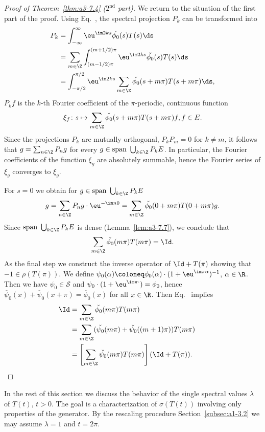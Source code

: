 \begin{proof}[Proof of Theorem~\ref{thm:a3-7.4} ($ 2^{\text{nd}} $ part)]
We return to the situation of the first part of the proof.
Using Eq.~, the spectral projection $P_{k}$ can be transformed into
\begin{align*}
P_{k} &= \int_{-\infty}^{\infty} \eu^{\im 2ks}\check{\phi_{0}}(s)T(s)\ds \\
&= \sum_{m\in\Z} \int_{(m-1/2)\pi}^{(m+1/2)\pi} \eu^{\im 2ks}\check{\phi_{0}}(s)T(s)\ds \\
&= \int_{-\pi/2}^{\pi/2} \eu^{\im 2ks}\sum_{m\in\Z}\check{\phi_{0}}(s+m\pi)T(s+m\pi)\ds ,
\end{align*}
\ie $P_{k}f$ is the $k$-th Fourier coefficient of the $\pi$-periodic, continuous function 
\[
\xi_{f} \colon s \mapsto \sum_{m\in\Z} \check{\phi_{0}}(s+m\pi)T(s+m\pi)f ,  f \in E .
\]
Since the projections $P_{k}$ are mutually orthogonal, \ie $P_{k}P_{m} = 0$ for $k \neq m$, it follows that $g = \sum_{n\in\Z} P_{n}g$ for every $g \in \text{span }\bigcup_{k\in\Z} P_{k}E$.
In particular, the Fourier coefficients of the function $\xi_{g}$ are absolutely summable, hence the Fourier series of\/ $\xi_{g}$ converges to $\xi_g$.

For $s = 0$ we obtain for 
$g \in \text{span }\bigcup_{k\in\Z} P_{k}E$
\[
g = \sum_{n\in\Z} P_{n}g\cdot \eu^{-\im n0} = \sum_{m\in\Z} \check{\phi_{0}}(0 + m\pi)T(0 + m\pi)g .
\]
Since $\text{span }\bigcup_{k\in\Z} P_{k}E$ is dense (Lemma~\ref{lem:a3-7.7}), we conclude that
\begin{equation}\label{eq:a3-7.6}
\sum_{m\in\Z} \check{\phi_{0}}(m\pi)T(m\pi) = \Id .
\end{equation}
As the final step we construct the inverse operator of\/ $\Id + T(\pi)$ showing that $-1 \in \rho(T(\pi))$.
We define $\psi_{0}(\alpha) \coloneq \phi_{0}(\alpha)\cdot(1 + \eu^{\im\pi\alpha})^{-1}$, $\alpha \in \R$.
Then we have $\psi_{0} \in \mathcal{S}$ and $\psi_{0}\cdot(1 + \eu^{\im\pi\cdot}) = \phi_{0}$,
hence $\check{\psi_{0}}(x) + \check{\psi_{0}}(x + \pi) = \check{\phi_{0}}(x)$ for all $x \in \R$.
Then Eq.~ implies
\begin{align*}
\Id &= \sum_{m\in\Z} \check{\phi_{0}}(m\pi)T(m\pi) \\
&= \sum_{m\in\Z} (\check{\psi_{0}}(m\pi) + \check{\psi_{0}}((m+1)\pi))T(m\pi) \\
&= \left[ \sum_{m\in\Z} \check{\psi_{0}}(m\pi)T(m\pi) \right] (\Id + T(\pi)) . \tag*{\qedsymbol}%
\end{align*}
\let\qedsymbol\relax
\end{proof}
In the rest of this section we discuss the behavior of the single spectral values $\lambda$ of\/ $T(t)$, $t > 0$.
The goal is a characterization of\/ $\sigma(T(t))$ involving only properties of the generator.
By the rescaling procedure Section~\ref{subsec:a1-3.2} we may assume $\lambda = 1$ and $t = 2\pi$.

